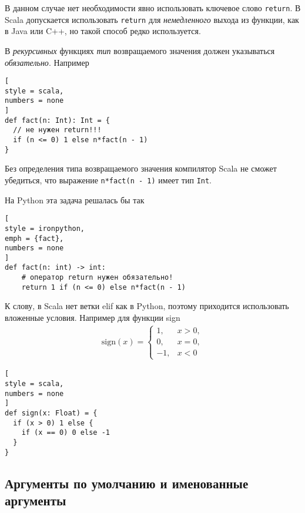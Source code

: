 \documentclass[%
	11pt,
	a4paper,
	utf8,
		]{article}
\begin{document}
В данном случае нет необходимости явно использовать ключевое слово \texttt{return}. В Scala допускается использовать \texttt{return} для \emph{немедленного} выхода из функции, как в Java или C++, но такой способ редко используется.


В \emph{рекурсивных} функциях \emph{тип} возвращаемого значения должен указываться \emph{обязательно}. Например
\begin{lstlisting}[
style = scala,
numbers = none
]
def fact(n: Int): Int = {
  // не нужен return!!!
  if (n <= 0) 1 else n*fact(n - 1)
}
\end{lstlisting}

Без определения типа возвращаемого значения компилятор Scala не сможет убедиться, что выражение \texttt{n*fact(n - 1)} имеет тип \texttt{Int}.

На Python эта задача решалась бы так
\begin{lstlisting}[
style = ironpython,
emph = {fact},
numbers = none
]
def fact(n: int) -> int:
    # оператор return нужен обязательно!
    return 1 if (n <= 0) else n*fact(n - 1)
\end{lstlisting}

К слову, в Scala нет ветки elif как в Python, поэтому приходится использовать вложенные условия. Например для функции sign
\begin{align*}
	\mathrm{sign}(x) = 
	\begin{cases}
		1, &x > 0,\\
		0, &x = 0,\\
		-1, &x < 0
	\end{cases}
\end{align*}

\begin{lstlisting}[
style = scala,
numbers = none
]
def sign(x: Float) = {
  if (x > 0) 1 else {
    if (x == 0) 0 else -1
  }
}
\end{lstlisting}

\subsection{Аргументы по умолчанию и именованные аргументы}
\end{document}
